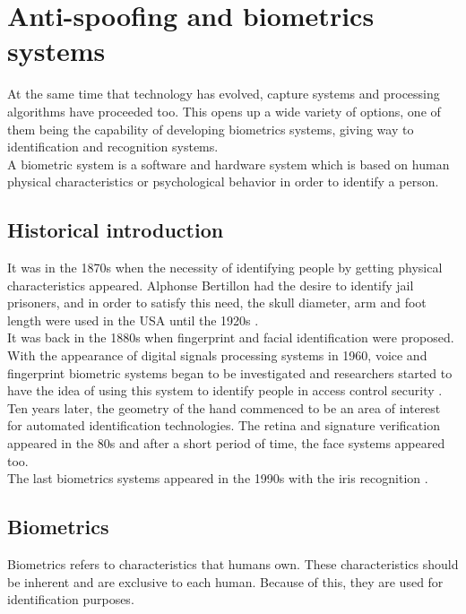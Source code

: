 \section{Anti-spoofing and biometrics systems}
At the same time that technology has evolved, capture systems and processing algorithms have proceeded too. This opens up a wide variety of options,  one of them being the capability of developing biometrics systems, giving way to identification and recognition systems.\\

A biometric system is a software and hardware system which is based on human physical characteristics or psychological behavior in order to identify a person.

\subsection{Historical introduction}
It was in the 1870s when the necessity of identifying people by getting physical characteristics appeared. Alphonse Bertillon had the desire to identify jail prisoners, and in order to satisfy this need, the skull diameter, arm and foot length were used in the USA until the 1920s \cite{Intro_biometrics}.\\

It was back in the 1880s when fingerprint and facial identification were proposed. With the appearance of digital signals processing systems in 1960, voice and fingerprint biometric systems began to be investigated and researchers started to have the idea of using this system to identify people in access control security \cite{Intro_biometrics}.\\

Ten years later, the geometry of the hand commenced to be an area of interest for automated identification technologies. The retina and signature verification appeared in the 80s and after a short period of time, the face systems appeared too\cite{Intro_biometrics}.\\

The last biometrics systems appeared in the 1990s with the iris recognition \cite{Intro_biometrics}.

\subsection{Biometrics}
Biometrics refers to characteristics that humans own. These characteristics should be inherent and are exclusive to each human. Because of this, they are used for identification purposes.\\

